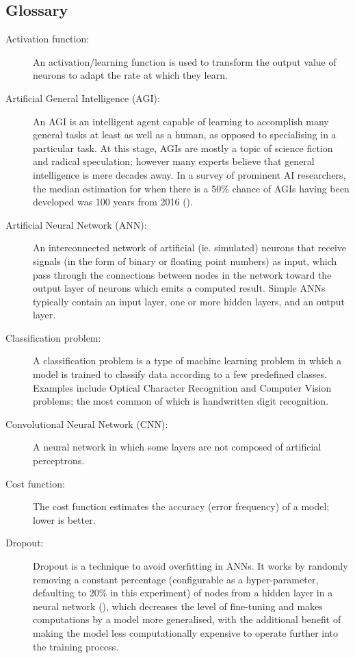 \documentclass[]{report}
\begin{document}
\subsection{Glossary}
\begin{description}
\item[Activation function:] An activation/learning function is used to transform the output value of neurons to adapt the rate at which they learn.

\item[Artificial General Intelligence (AGI):] An AGI is an intelligent agent capable of learning to accomplish many general tasks at least as well as a human, as opposed to specialising in a particular task. At this stage, AGIs are mostly a topic of science fiction and radical speculation; however many experts believe that general intelligence is mere decades away. In a survey of prominent AI researchers, the median estimation for when there is a 50\% chance of AGIs having been developed was 100 years from 2016 (\cite{grace2017will}).

\item[Artificial Neural Network (ANN):] An interconnected network of artificial (ie. simulated) neurons that receive signals (in the form of binary or floating point numbers) as input, which pass through the connections between nodes in the network toward the output layer of neurons which emits a computed result. Simple ANNs typically contain an input layer, one or more hidden layers, and an output layer.

\item[Classification problem:] A classification problem is a type of machine learning problem in which a model is trained to classify data according to a few predefined classes. Examples include Optical Character Recognition and Computer Vision problems; the most common of which is handwritten digit recognition.

\item[Convolutional Neural Network (CNN):] A neural network in which some layers are not composed of artificial perceptrons.

\item[Cost function:] The cost function estimates the accuracy (error frequency) of a model; lower is better.

\item[Dropout:] Dropout is a technique to avoid overfitting in ANNs. It works by randomly removing a constant percentage (configurable as a hyper-parameter, defaulting to 20\% in this experiment) of nodes from a hidden layer in a neural network (\cite{dropout14}), which decreases the level of fine-tuning and makes computations by a model more generalised, with the additional benefit of making the model less computationally expensive to operate further into the training process.


\end{description}
\end{document}
